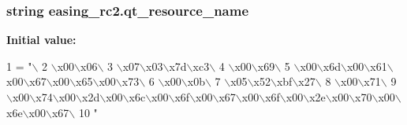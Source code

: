 \subsubsection[{qt\+\_\+resource\+\_\+name}]{\setlength{\rightskip}{0pt plus 5cm}string easing\+\_\+rc2.\+qt\+\_\+resource\+\_\+name}\label{namespaceeasing__rc2_a3b10a58aeb2fc1cead97b188e0d87b8c}
{\bfseries Initial value\+:}
\begin{DoxyCode}
1 = \textcolor{stringliteral}{"\(\backslash\)}
2 \textcolor{stringliteral}{\(\backslash\)x00\(\backslash\)x06\(\backslash\)}
3 \textcolor{stringliteral}{\(\backslash\)x07\(\backslash\)x03\(\backslash\)x7d\(\backslash\)xc3\(\backslash\)}
4 \textcolor{stringliteral}{\(\backslash\)x00\(\backslash\)x69\(\backslash\)}
5 \textcolor{stringliteral}{\(\backslash\)x00\(\backslash\)x6d\(\backslash\)x00\(\backslash\)x61\(\backslash\)x00\(\backslash\)x67\(\backslash\)x00\(\backslash\)x65\(\backslash\)x00\(\backslash\)x73\(\backslash\)}
6 \textcolor{stringliteral}{\(\backslash\)x00\(\backslash\)x0b\(\backslash\)}
7 \textcolor{stringliteral}{\(\backslash\)x05\(\backslash\)x52\(\backslash\)xbf\(\backslash\)x27\(\backslash\)}
8 \textcolor{stringliteral}{\(\backslash\)x00\(\backslash\)x71\(\backslash\)}
9 \textcolor{stringliteral}{\(\backslash\)x00\(\backslash\)x74\(\backslash\)x00\(\backslash\)x2d\(\backslash\)x00\(\backslash\)x6c\(\backslash\)x00\(\backslash\)x6f\(\backslash\)x00\(\backslash\)x67\(\backslash\)x00\(\backslash\)x6f\(\backslash\)x00\(\backslash\)x2e\(\backslash\)x00\(\backslash\)x70\(\backslash\)x00\(\backslash\)x6e\(\backslash\)x00\(\backslash\)x67\(\backslash\)}
10 \textcolor{stringliteral}{"}
\end{DoxyCode}
\hypertarget{namespaceeasing__rc2_a839bc498f7d239274a26c4522eb16a1b}{}
